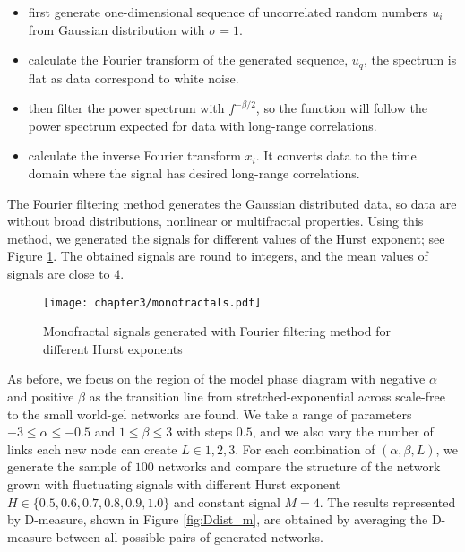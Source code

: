 \begin{itemize}
	\item first generate one-dimensional sequence of uncorrelated random numbers $u_i$ from Gaussian distribution with $\sigma=1$.
	\item calculate the Fourier transform of the generated sequence, $u_q$, the spectrum is flat as data correspond to white noise.
	\item then filter the power spectrum with $f^{-\beta/2}$, so the function will follow the power spectrum expected for data with long-range correlations. 	
	\item  calculate the inverse Fourier transform $x_i$. It converts data to the time domain where the signal has desired long-range correlations.
	
\end{itemize}     

The Fourier filtering method generates the Gaussian distributed data, so data are without broad distributions, nonlinear or multifractal properties. Using this method, we generated the signals for different values of the Hurst exponent; see Figure \ref{fig:monofractals}. The obtained signals are round to integers, and the mean values of signals are close to $4$.

\begin{figure}[ht!]
	\centering
	\texttt{[image: chapter3/monofractals.pdf]}
	\caption[Long range correlated monofractal signals]{Monofractal signals generated with Fourier filtering method for different Hurst exponents}
	\label{fig:monofractals}
\end{figure}  


As before, we focus on the region of the model phase diagram with negative $\alpha$ and positive $\beta$ as the transition line from stretched-exponential across scale-free to the small world-gel networks are found. We take a range of parameters  $-3\leq\alpha\leq-0.5$ and $1\leq\beta\leq3$ with steps $0.5$, and we also vary the number of links each new node can create $L\in{1, 2, 3}$. For each combination of $(\alpha, \beta, L)$, we generate the sample of $100$ networks and compare the structure of the network grown with fluctuating signals with different Hurst exponent $H \in \{0.5, 0.6, 0.7, 0.8, 0.9, 1.0\}$ and constant signal $M=4$. The results represented by D-measure, shown in Figure \ref{fig:Ddist_m}, are obtained by averaging the D-measure between all possible pairs of generated networks.   

